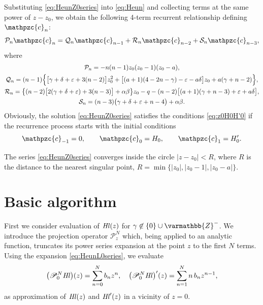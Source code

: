 \documentclass[11pt]{article}
\newcommand{\MF}[1]{\mathop{#1}\nolimits}
\newcommand{\Zz}{\varmathbb{Z}}%
\newcommand{\Pcoef}{\mathcal{P}}
\newcommand{\Qcoef}{\mathcal{Q}}
\newcommand{\Rcoef}{\mathcal{R}}
\newcommand{\Scoef}{\mathcal{S}}
\def\HeunL{\MF{\textit{Hl\/}}}%
\def\car{\mathpzc{c}}
\begin{document}
Substituting \eqref{eq:HeunZ0series} into \eqref{eq:Heun} and collecting terms
at the same power of $z-z_0$, we obtain the following 4-term recurrent
relationship defining $\car_n$:
\begin{equation}
\Pcoef_n \car_n=\Qcoef_n \car_{n-1}+\Rcoef_n \car_{n-2} + \Scoef_n
\car_{n-3},\label{eq:HeunZ0Cndef}
\end{equation}
where
\begin{gather*}
\Pcoef_n=-n(n-1)z_0(z_0-1)(z_0-a),\\ \Qcoef_n=(n-1)\Bigl\{
\bigl[\gamma+\delta+\varepsilon+3(n-2)\bigr]z_0^2+
\bigl[(a+1)(4-2n-\gamma)-\varepsilon-a\delta\bigr]z_0 + a(\gamma+n-2)\Bigr\}, \\
\Rcoef_n=\bigl\{(n-2)\bigl[2(\gamma+\delta+\varepsilon)+3(n-3)\bigr]+
\alpha\beta\big\}z_0-q
{}-(n-2)\bigl[(a+1)(\gamma+n-3)+\varepsilon+a\delta\bigr], \\
\Scoef_n=(n-3)\bigl(\gamma+\delta+\varepsilon+n-4\bigr)+\alpha\beta.
\end{gather*}
Obviously, the solution \eqref{eq:HeunZ0series} satisfies the conditions \eqref{eq:z0H0H'0} if
the recurrence process starts with the initial conditions 
\begin{equation*}
\car_{-1}=0,\qquad \car_{0}=H_0,\qquad \car_{1}=H'_0.
\end{equation*}

The series \eqref{eq:HeunZ0series} converges inside the circle $|z-z_0|<R$,
where $R$ is the distance to the nearest singular point,
$R=\min\{|z_0|,|z_0-1|,|z_0-a|\}$.

\section{Basic algorithm}
\label{sect:basic_algorithm}

First we consider evaluation of $\HeunL(z)$ for $\gamma\not\in\{0\}\cup\Zz^-$.
We introduce the projection operator $\mathscr{P}_{z}^N$ which, being applied to
an analytic function, truncates its power series expansion at the point $z$ to
the first $N$ terms. Using the expansion \eqref{eq:HeunL0series}, we evaluate
\begin{equation}
\bigl(\mathscr{P}_0^N\!\HeunL\bigr)(z)=\sum_{n=0}^{N}b_n z^n,\quad
\bigl(\mathscr{P}_0^N\!\HeunL\bigr)'(z)=\sum_{n=1}^{N}n\, b_n z^{n-1},
\label{eq:HeunLpwrserappr}
\end{equation}
as  approximation of $\HeunL(z)$ and $\HeunL'(z)$  in a vicinity of $z=0$.
\end{document}
